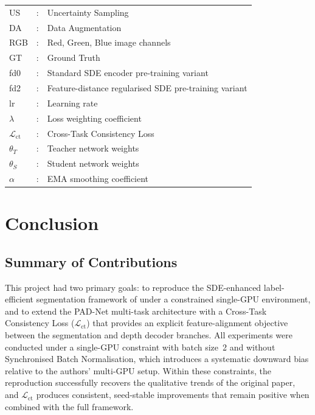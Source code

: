 \documentclass[
  oneside,
  author={Shijie Lu},
  degree={BSc},
  title={Label-Efficient Semantic Segmentation via Self-Supervised Depth Estimation and Cross-Task Consistency},
  unit={COMS30045},
  subtitle={}
]{dissertation}
\begin{document}
\begin{tabular}{lcl}
US          &:& Uncertainty Sampling                              \\
DA          &:& Data Augmentation                                 \\
RGB         &:& Red, Green, Blue image channels                   \\
GT          &:& Ground Truth                                      \\
fd0         &:& Standard SDE encoder pre-training variant         \\
fd2         &:& Feature-distance regularised SDE pre-training variant \\
lr          &:& Learning rate                                     \\
$\lambda$   &:& Loss weighting coefficient                        \\
$\mathcal{L}_\text{ct}$ &:& Cross-Task Consistency Loss           \\
$\theta_T$  &:& Teacher network weights                           \\
$\theta_S$  &:& Student network weights                           \\
$\alpha$    &:& EMA smoothing coefficient                         \\
\end{tabular}

\mainmatter






\chapter{Conclusion}
\label{chap:conclusion}

\section{Summary of Contributions}

\noindent
This project had two primary goals: to reproduce the SDE-enhanced
label-efficient segmentation framework of \cite{hoyer2023improving} under
a constrained single-GPU environment, and to extend the PAD-Net
multi-task architecture with a Cross-Task Consistency Loss
($\mathcal{L}_\text{ct}$) that provides an explicit feature-alignment
objective between the segmentation and depth decoder branches. All
experiments were conducted under a single-GPU constraint with batch
size~2 and without Synchronised Batch Normalisation, which introduces
a systematic downward bias relative to the authors' multi-GPU setup.
Within these constraints, the reproduction successfully recovers the
qualitative trends of the original paper, and $\mathcal{L}_\text{ct}$
produces consistent, seed-stable improvements that remain positive when
combined with the full framework.
\end{document}
